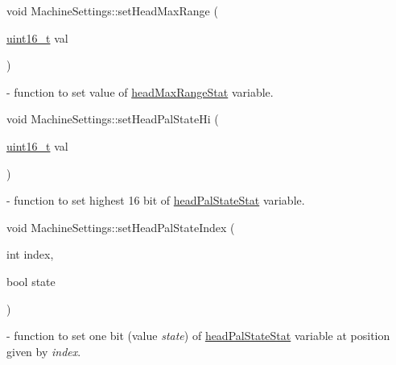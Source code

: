 \mbox{\label{classMachineSettings_a5ec4d87fc0832c6b79d5229085237252}} 
{\footnotesize\ttfamily void Machine\+Settings\+::\texorpdfstring{set\+Head\+Max\+Range}{setHeadMaxRange} (\begin{DoxyParamCaption}\item[{\mbox{\hyperlink{settings_8h_a017dd44e68049ffdd31500a8cd01ba68}{uint16\+\_\+t}}}]{val }\end{DoxyParamCaption}){\ttfamily [static]}} - function to set value of \hyperlink{classMachineSettings_ab223e2bea0de3ab0c85452d124d2b434}{head\+Max\+Range\+Stat} variable.

\mbox{\label{classMachineSettings_a8b1fe308c75ea1bafd283e0f97b87a93}} 
{\footnotesize\ttfamily void Machine\+Settings\+::\texorpdfstring{set\+Head\+Pal\+State\+Hi}{setHeadPalStateHi} (\begin{DoxyParamCaption}\item[{\mbox{\hyperlink{settings_8h_a017dd44e68049ffdd31500a8cd01ba68}{uint16\+\_\+t}}}]{val }\end{DoxyParamCaption}){\ttfamily [static]}} - function to set highest 16 bit of \hyperlink{classMachineSettings_a1543a985ca7e47a2853dcfef75227a5a}{head\+Pal\+State\+Stat} variable.

\mbox{\label{classMachineSettings_aa568893fe06e0bc946dc7ceb33535aaa}} 
{\footnotesize\ttfamily void Machine\+Settings\+::\texorpdfstring{set\+Head\+Pal\+State\+Index}{setHeadPalStateIndex} (\begin{DoxyParamCaption}\item[{int}]{index,  }\item[{bool}]{state }\end{DoxyParamCaption}){\ttfamily [static]}} - function to set one bit (value \textit{state}) of \hyperlink{classMachineSettings_a1543a985ca7e47a2853dcfef75227a5a}{head\+Pal\+State\+Stat} variable at position given by \textit{index}.

